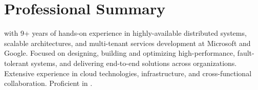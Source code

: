 \section{Professional Summary}
\small{\POSITION{} with 9+ years of hands-on experience in highly-available distributed systems, scalable
    architectures, and multi-tenant services development at Microsoft and Google. Focused on designing, building
    and optimizing high-performance, fault-tolerant systems, and delivering end-to-end solutions across
    organizations. Extensive experience in cloud technologies, infrastructure, and cross-functional collaboration.
    Proficient in \LanguagesOrder\MainTechnologies.}
